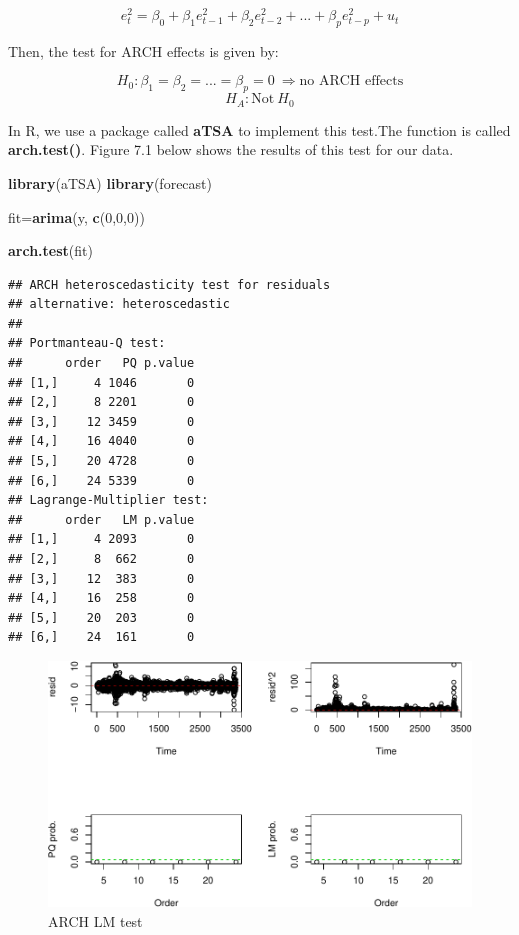\documentclass[]{book}
\newenvironment{Shaded}{\begin{snugshade}}{\end{snugshade}}
\newcommand{\DecValTok}[1]{\textcolor[rgb]{0.00,0.00,0.81}{#1}}
\newcommand{\KeywordTok}[1]{\textcolor[rgb]{0.13,0.29,0.53}{\textbf{#1}}}
\newcommand{\NormalTok}[1]{#1}
\theoremstyle{definition}
\theoremstyle{definition}
\theoremstyle{definition}
\theoremstyle{remark}
\begin{document}
\[e^2_t= \beta_0 +\beta_1 e^2_{t-1} + \beta_2 e^2_{t-2}+...+ \beta_p e^2_{t-p} + u_t\]

Then, the test for ARCH effects is given by:

\[H_0: \beta_1=\beta_2=...=\beta_p=0 \ \Rightarrow \text{no ARCH effects}\]
\[ H_A: \text{Not} \ H_0\]

In R, we use a package called \textbf{aTSA} to implement this test.The
function is called \textbf{arch.test()}. Figure 7.1 below shows the
results of this test for our data.

\begin{Shaded}
\begin{Highlighting}[]
\KeywordTok{library}\NormalTok{(aTSA)}
\KeywordTok{library}\NormalTok{(forecast)}

\NormalTok{fit=}\KeywordTok{arima}\NormalTok{(y, }\KeywordTok{c}\NormalTok{(}\DecValTok{0}\NormalTok{,}\DecValTok{0}\NormalTok{,}\DecValTok{0}\NormalTok{))}

\KeywordTok{arch.test}\NormalTok{(fit)}
\end{Highlighting}
\end{Shaded}

\begin{verbatim}
## ARCH heteroscedasticity test for residuals 
## alternative: heteroscedastic 
## 
## Portmanteau-Q test: 
##      order   PQ p.value
## [1,]     4 1046       0
## [2,]     8 2201       0
## [3,]    12 3459       0
## [4,]    16 4040       0
## [5,]    20 4728       0
## [6,]    24 5339       0
## Lagrange-Multiplier test: 
##      order   LM p.value
## [1,]     4 2093       0
## [2,]     8  662       0
## [3,]    12  383       0
## [4,]    16  258       0
## [5,]    20  203       0
## [6,]    24  161       0
\end{verbatim}

\begin{figure}
\centering
\includegraphics{bookdown-demo_files/figure-latex/table1-1.pdf}
\caption{\label{fig:table1}ARCH LM test}
\end{figure}
\end{document}
